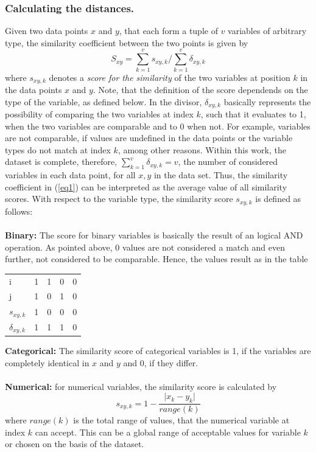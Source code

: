 \documentclass[runningheads]{llncs}
\begin{document}
	\subsubsection{Calculating the distances.}
	
	Given two data points $x$ and $y$, that each form a tuple of $v$ variables of arbitrary type, the similarity coefficient between the two points is given by
	\begin{equation}\label{eq1}
	S_{xy} = \sum_{k=1}^{v} s_{xy,k} / \sum_{k=1}^{v} \delta_{xy,k} 
	\end{equation} 
	where $s_{xy,k}$ denotes a \textit{score for the similarity} of the two variables at position $k$ in the data points $x$ and $y$. Note, that the definition of the score dependends on the type of the variable, as defined below. In the divisor, $\delta_{xy,k}$ basically represents the possibility of comparing the two variables at index $k$, such that it evaluates to 1, when the two variables are comparable and to 0 when not. For example, variables are not comparable, if values are undefined in the data points or the variable types do not match at index $k$, among other reasons. Within this work, the dataset is complete, therefore, $\sum_{k=1}^{v} \delta_{xy,k}=v$, the number of considered variables in each data point, for all $x, y$ in the data set. Thus, the similarity coefficient in (\ref{eq1}) can be interpreted as the average value of all similarity scores. 
	With respect to the variable type, the similarity score $s_{xy,k}$ is defined as follows:\\
	\\ \textbf{Binary:} The score for binary variables is basically the result of an logical AND operation. As pointed above, 0 values are not considered a match and even further, not considered to be comparable. Hence, the values result as in the table
		\begin{center}
			\begin{tabular}{l | c c c r}
				i & 1 & 1 & 0 & 0 \\
				j & 1 & 0 & 1 & 0 \\
				\hline
				$s_{xy,k}$ & 1 & 0 & 0 & 0 \\
				$\delta_{xy,k}$ & 1 & 1 & 1 & 0
			\end{tabular}
		\end{center}	
	\textbf{Categorical:} The similarity score of categorical variables is 1, if the variables are completely identical in $x$ and $y$ and 0, if they differ.\\
	\\ \textbf{Numerical:} for numerical variables, the similarity score is calculated by
		\begin{equation*}
		s_{xy,k} = 1 - \frac{\vert x_k - y_k \vert}{range(k)}
		\end{equation*}
		where $range(k)$ is the total range of values, that the numerical variable at index $k$ can accept. This can be a global range of acceptable values for variable $k$ or chosen on the basis of the dataset.
\end{document}
